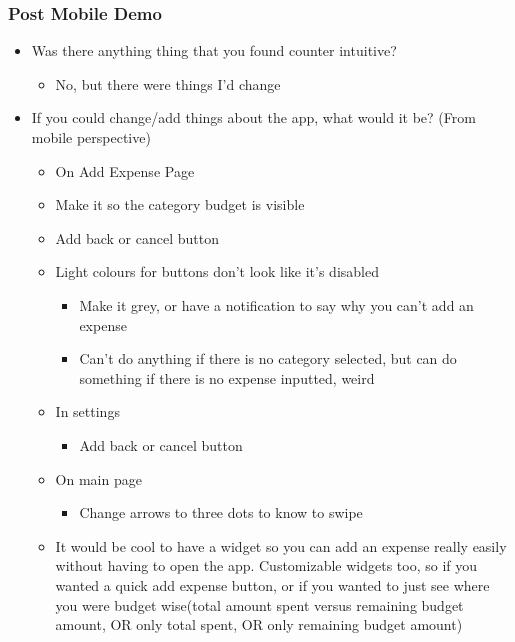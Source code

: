\documentclass{chi2011}
\begin{document}
\begin{itemize}[noitemsep]
	\subsubsection{Post Mobile Demo}
	\begin{itemize}[noitemsep]
		\item Was there anything thing that you found counter intuitive?
		\begin{itemize}[noitemsep]
			\item No, but there were things I'd change
		\end{itemize}
		\item If you could change/add things about the app, what would it be? (From mobile perspective)
		\begin{itemize}[noitemsep]
			\item On Add Expense Page
			\item Make it so the category budget is visible
			\item Add back or cancel button
			\item Light colours for buttons don't look like it's disabled
			\begin{itemize}[noitemsep]
				\item Make it grey, or have a notification to say why you can't add an expense
				\item Can't do anything if there is no category selected, but can do something if there
				  is no expense inputted, weird
			\end{itemize}
			\item In settings 
			\begin{itemize}[noitemsep]
				\item Add back or cancel button
			\end{itemize}
			\item On main page
			\begin{itemize}[noitemsep]
				\item Change arrows to three dots to know to swipe
			\end{itemize}
			\item 
				It would be cool to have a widget so you can add an expense really easily without having 
				to open the app. Customizable widgets too, so if you wanted a quick add expense button, 
				or if you wanted to just see where you were budget wise(total amount spent versus 
				remaining budget amount, OR only total spent, OR only remaining budget amount)
		\end{itemize}
	\end{itemize}



\end{itemize}
\end{document}
